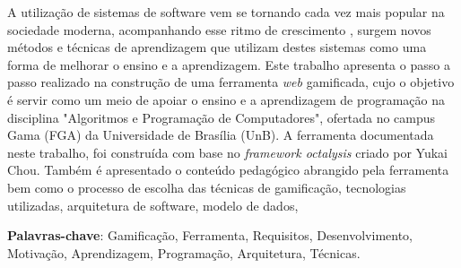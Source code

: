 \begin{resumo}

    A utilização de sistemas de software vem se tornando cada vez mais popular na sociedade moderna, acompanhando esse ritmo de crescimento
    , surgem novos métodos e técnicas de aprendizagem que utilizam destes sistemas como uma forma de melhorar o ensino e a aprendizagem. Este trabalho 
    apresenta o passo a passo realizado na construção de uma ferramenta \textit{web} gamificada, cujo o objetivo é servir como um meio
    de apoiar o ensino e a aprendizagem de programação na disciplina "Algoritmos e Programação de Computadores", ofertada no campus Gama (FGA) da 
    Universidade de Brasília (UnB). A ferramenta documentada neste trabalho, foi construída com base no \textit{framework octalysis} criado por Yukai Chou. Também é apresentado o conteúdo pedagógico abrangido pela ferramenta
    bem como o processo de escolha das técnicas de gamificação, tecnologias utilizadas, arquitetura de software, modelo de dados, 
    
     \vspace{\onelineskip}
        
     \noindent
     \textbf{Palavras-chave}: Gamificação, Ferramenta, Requisitos, Desenvolvimento, Motivação, Aprendizagem, Programação, Arquitetura, Técnicas.
    \end{resumo}